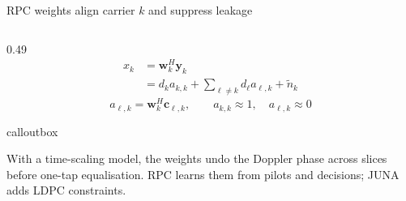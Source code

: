 \documentclass[aspectratio=169,10pt]{beamer}
\newenvironment{callout}{%
  \begin{beamercolorbox}[wd=\linewidth,sep=4pt,rounded=true]{calloutbox}\scriptsize%
}{%
  \end{beamercolorbox}%
}
\begin{document}
\begin{frame}{RPC weights align carrier $k$ and suppress leakage}
\begin{columns}[T,onlytextwidth]
    \begin{column}{0.49\textwidth}
      \footnotesize
      \setlength{\abovedisplayskip}{0.35em}
      \setlength{\belowdisplayskip}{0.35em}
      \[
      \begin{aligned}
        x_k&=\mathbf{w}_k^H\mathbf{y}_k\\
            &= d_k a_{k,k}
             + \sum_{\ell\ne k} d_\ell a_{\ell,k}
             + \tilde n_k
      \end{aligned}
      \]
      \[
        a_{\ell,k}=\mathbf{w}_k^H\mathbf{c}_{\ell,k},
        \qquad
        a_{k,k}\approx 1,\quad a_{\ell,k}\approx 0
      \]
      \begin{callout}
        With a time-scaling model, the weights undo the Doppler phase across slices before one-tap equalisation. RPC learns them from pilots and decisions; JUNA adds LDPC constraints.
      \end{callout}
    \end{column}
  \end{columns}
\end{frame}
\end{document}
